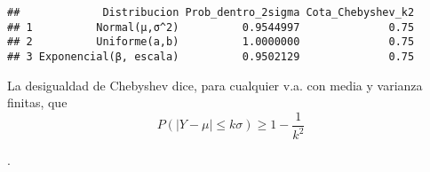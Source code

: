 \documentclass[
]{article}
\begin{document}
\begin{verbatim}
##             Distribucion Prob_dentro_2sigma Cota_Chebyshev_k2
## 1          Normal(μ,σ^2)          0.9544997              0.75
## 2          Uniforme(a,b)          1.0000000              0.75
## 3 Exponencial(β, escala)          0.9502129              0.75
\end{verbatim}

La desigualdad de Chebyshev dice, para cualquier v.a. con media y
varianza finitas, que \[P(|Y-\mu| \leq k\sigma) \geq 1 - \frac{1}{k^2}\]

.
\end{document}
